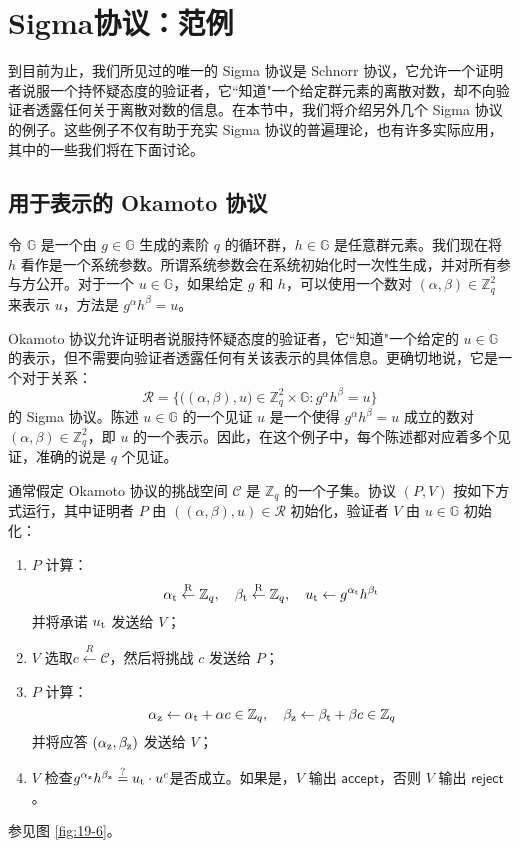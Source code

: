 \section{Sigma协议：范例}

到目前为止，我们所见过的唯一的 Sigma 协议是 Schnorr 协议，它允许一个证明者说服一个持怀疑态度的验证者，它``知道"一个给定群元素的离散对数，却不向验证者透露任何关于离散对数的信息。在本节中，我们将介绍另外几个 Sigma 协议的例子。这些例子不仅有助于充实 Sigma 协议的普遍理论，也有许多实际应用，其中的一些我们将在下面讨论。

\subsection{用于表示的 Okamoto 协议}\label{subsec:19-5-1}

令 $\mathbb{G}$ 是一个由 $g\in\mathbb{G}$ 生成的素阶 $q$ 的循环群，$h\in\mathbb{G}$ 是任意群元素。我们现在将 $h$ 看作是一个系统参数。所谓系统参数会在系统初始化时一次性生成，并对所有参与方公开。对于一个 $u\in\mathbb{G}$，如果给定 $g$ 和 $h$，可以使用一个数对 $(\alpha,\beta)\in\mathbb{Z}_q^2$ 来表示 $u$，方法是 $g^\alpha h^\beta=u$。

Okamoto 协议允许证明者说服持怀疑态度的验证者，它``知道"一个给定的 $u\in\mathbb{G}$ 的表示，但不需要向验证者透露任何有关该表示的具体信息。更确切地说，它是一个对于关系：
\begin{equation}\label{eq:19-11}
	\mathcal{R}=\bigg\lbrace
	\big((\alpha,\beta),u\big)\in\mathbb{Z}_q^2\times\mathbb{G}:g^\alpha h^\beta=u
	\bigg\rbrace
\end{equation}
的 Sigma 协议。陈述 $u\in\mathbb{G}$ 的一个见证 $u$ 是一个使得 $g^\alpha h^\beta=u$ 成立的数对 $(\alpha,\beta)\in\mathbb{Z}_q^2$，即 $u$ 的一个表示。因此，在这个例子中，每个陈述都对应着多个见证，准确的说是 $q$ 个见证。

通常假定 Okamoto 协议的挑战空间 $\mathcal{C}$ 是 $\mathbb{Z}_q$ 的一个子集。协议 $(P,V)$ 按如下方式运行，其中证明者 $P$ 由 $((\alpha,\beta),u)\in\mathcal{R}$ 初始化，验证者 $V$ 由 $u\in\mathbb{G}$ 初始化：
\begin{enumerate}
	\item $P$ 计算：
	\[
    \alpha_{\rm t}\overset{\rm R}\leftarrow\mathbb{Z}_q,
    \quad
    \beta_{\rm t}\overset{\rm R}\leftarrow\mathbb{Z}_q,
    \quad
    u_{\rm t}\leftarrow g^{\alpha_{\rm t}}h^{\beta_{\rm t}}
    \]
    并将承诺 $u_{\rm t}$ 发送给 $V$；
	\item $V$ 选取$c\overset{R}\leftarrow\mathcal{C}$，然后将挑战 $c$ 发送给 $P$；
	\item $P$ 计算：
	\[
    \alpha_{\rm z}\leftarrow\alpha_{\rm t}+\alpha c\in\mathbb{Z}_q,
    \quad
    \beta_{\rm z}\leftarrow\beta_{\rm t}+\beta c\in\mathbb{Z}_q
    \]
    并将应答 $(\alpha_{\rm z}, \beta_{\rm z})$ 发送给 $V$；
	\item $V$ 检查$g^{\alpha_{\rm z}}h^{\beta_{\rm z}}\overset{?}=u_{\rm t}\cdot u^c$是否成立。如果是，$V$ 输出 $\mathsf{accept}$，否则 $V$ 输出 $\mathsf{reject}$。
\end{enumerate}
参见图 \ref{fig:19-6}。

